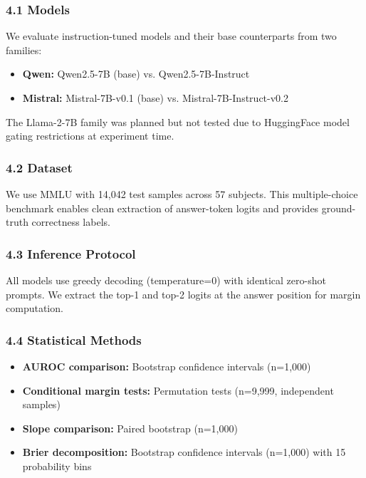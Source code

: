 
\subsubsection{4.1 Models}

We evaluate instruction-tuned models and their base counterparts from two families:

\begin{itemize}
\item \textbf{Qwen:} Qwen2.5-7B (base) vs. Qwen2.5-7B-Instruct
\item \textbf{Mistral:} Mistral-7B-v0.1 (base) vs. Mistral-7B-Instruct-v0.2
\end{itemize}

The Llama-2-7B family was planned but not tested due to HuggingFace model gating restrictions at experiment time.

\subsubsection{4.2 Dataset}

We use MMLU \citep{Hendrycks2021MMLU} with 14,042 test samples across 57 subjects. This multiple-choice benchmark enables clean extraction of answer-token logits and provides ground-truth correctness labels.

\subsubsection{4.3 Inference Protocol}

All models use greedy decoding (temperature=0) with identical zero-shot prompts. We extract the top-1 and top-2 logits at the answer position for margin computation.

\subsubsection{4.4 Statistical Methods}

\begin{itemize}
\item \textbf{AUROC comparison:} Bootstrap confidence intervals (n=1,000)
\item \textbf{Conditional margin tests:} Permutation tests (n=9,999, independent samples)
\item \textbf{Slope comparison:} Paired bootstrap (n=1,000)
\item \textbf{Brier decomposition:} Bootstrap confidence intervals (n=1,000) with 15 probability bins
\end{itemize}
